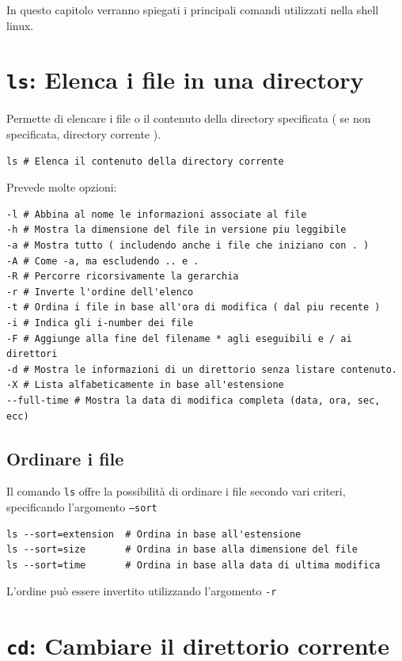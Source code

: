 \documentclass[a4paper]{report}
\newenvironment{code}{\begin{tcolorbox}[size=small]}{\end{tcolorbox}}
\begin{document}
In questo capitolo verranno spiegati i principali comandi utilizzati nella shell linux.

\section{\texttt{ls}: Elenca i file in una directory}
Permette di elencare i file o il contenuto della directory specificata ( se non specificata, directory corrente ).

\begin{code}
\begin{lstlisting}
ls # Elenca il contenuto della directory corrente
\end{lstlisting}

Prevede molte opzioni:

\begin{lstlisting}
-l # Abbina al nome le informazioni associate al file
-h # Mostra la dimensione del file in versione piu leggibile
-a # Mostra tutto ( includendo anche i file che iniziano con . )
-A # Come -a, ma escludendo .. e .
-R # Percorre ricorsivamente la gerarchia
-r # Inverte l'ordine dell'elenco
-t # Ordina i file in base all'ora di modifica ( dal piu recente )
-i # Indica gli i-number dei file
-F # Aggiunge alla fine del filename * agli eseguibili e / ai direttori
-d # Mostra le informazioni di un direttorio senza listare contenuto.
-X # Lista alfabeticamente in base all'estensione
--full-time # Mostra la data di modifica completa (data, ora, sec, ecc)
\end{lstlisting}
\end{code}

\subsection*{Ordinare i file}
Il comando \texttt{ls} offre la possibilità di ordinare i file secondo vari criteri, specificando l'argomento \texttt{--sort}

\begin{code}
\begin{lstlisting}
ls --sort=extension  # Ordina in base all'estensione
ls --sort=size       # Ordina in base alla dimensione del file
ls --sort=time       # Ordina in base alla data di ultima modifica
\end{lstlisting}

L'ordine può essere invertito utilizzando l'argomento \texttt{-r}
\end{code}

\section{\texttt{cd}: Cambiare il direttorio corrente}
\end{document}
